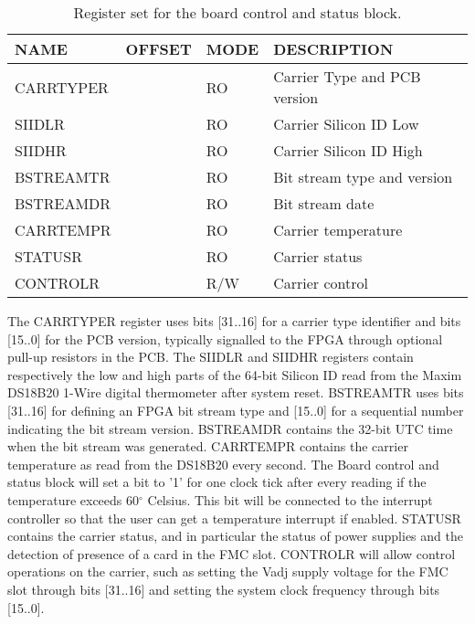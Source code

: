\documentclass{article}
\begin{document}
\begin{table}[htbp]
  \centering
  \begin{tabularx}{\textwidth}{|l|r|l|X|}
    \hline
    \textbf{NAME} & \textbf{OFFSET} & \textbf{MODE} & \textbf{DESCRIPTION} \\
    \hline
    \hline
    CARRTYPER & & RO & Carrier Type and PCB version\\
    \hline
    SIIDLR & & RO & Carrier Silicon ID Low \\
    \hline
    SIIDHR & & RO & Carrier Silicon ID High \\
    \hline
    BSTREAMTR & & RO & Bit stream type and version \\
    \hline
    BSTREAMDR & & RO & Bit stream date \\
    \hline
    CARRTEMPR & & RO & Carrier temperature \\
    \hline
    STATUSR & & RO & Carrier status \\
    \hline
    CONTROLR & & R/W & Carrier control \\
    \hline
  \end{tabularx}
  \caption{Register set for the board control and status block.}
  \label{tab:stat_control}
\end{table}

The CARRTYPER register uses bits [31..16] for a carrier type identifier and bits [15..0] for the PCB version, typically signalled to the FPGA through optional pull-up resistors in the PCB. The SIIDLR and SIIDHR registers contain respectively the low and high parts of the 64-bit Silicon ID read from the Maxim DS18B20 1-Wire digital thermometer after system reset. BSTREAMTR uses bits [31..16] for defining an FPGA bit stream type and [15..0] for a sequential number indicating the bit stream version. BSTREAMDR contains the 32-bit UTC time when the bit stream was generated. CARRTEMPR contains the carrier temperature as read from the DS18B20 every second. The Board control and status block will set a bit to '1' for one clock tick after every reading if the temperature exceeds 60$^\circ$ Celsius. This bit will be connected to the interrupt controller so that the user can get a temperature interrupt if enabled. STATUSR contains the carrier status, and in particular the status of power supplies and the detection of presence of a card in the FMC slot. CONTROLR will allow control operations on the carrier, such as setting the Vadj supply voltage for the FMC slot through bits [31..16] and setting the system clock frequency through bits [15..0].
\end{document}
